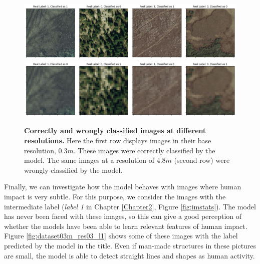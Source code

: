 \begin{figure}[H]
	\centering
	\captionsetup{width=1\linewidth}
	\includegraphics[width=1\textwidth]{Figures/results/class_dataset03m_res03_comp_correct.png}
	\includegraphics[width=1\textwidth]{Figures/results/class_dataset03m_res48_comp_wrong.png}
	\caption{\textbf{Correctly and wrongly classified images at different resolutions.} Here the first row displays images in their base resolution, $0.3m$. These images were correctly classified by the model. The same images at a resolution of $4.8m$ (second row) were wrongly classified by the model.}
	\label{fig:dataset03m_res03_res48_comp}
\end{figure}

Finally, we can investigate how the model behaves with images where human impact is very subtle. For this purpose, we consider the images with the intermediate label (\textit{label 1} in Chapter \ref{Chapter2}, Figure \ref{fig:imstats}). The model has never been faced with these images, so this can give a good perception of whether the models have been able to learn relevant features of human impact. Figure \ref{fig:dataset03m_res03_l1} shows some of these images with the label predicted by the model in the title. Even if man-made structures in these pictures are small, the model is able to detect straight lines and shapes as human activity. 

